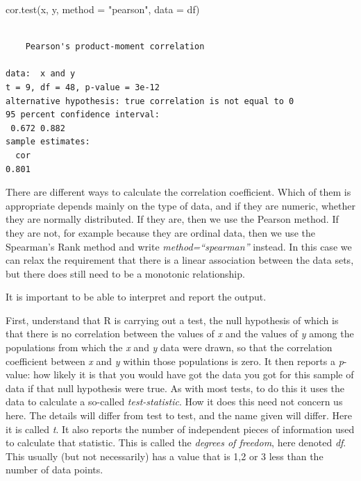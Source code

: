 \documentclass[
  letterpaper,
  DIV=11,
  numbers=noendperiod]{scrreprt}
\newenvironment{Shaded}{\begin{snugshade}}{\end{snugshade}}
\newcommand{\AttributeTok}[1]{\textcolor[rgb]{0.40,0.45,0.13}{#1}}
\newcommand{\FunctionTok}[1]{\textcolor[rgb]{0.28,0.35,0.67}{#1}}
\newcommand{\NormalTok}[1]{\textcolor[rgb]{0.00,0.23,0.31}{#1}}
\newcommand{\StringTok}[1]{\textcolor[rgb]{0.13,0.47,0.30}{#1}}
\begin{document}
\begin{Shaded}
\begin{Highlighting}[]
\FunctionTok{cor.test}\NormalTok{(x, y, }\AttributeTok{method =} \StringTok{"pearson"}\NormalTok{, }\AttributeTok{data =}\NormalTok{ df)}
\end{Highlighting}
\end{Shaded}

\begin{verbatim}

    Pearson's product-moment correlation

data:  x and y
t = 9, df = 48, p-value = 3e-12
alternative hypothesis: true correlation is not equal to 0
95 percent confidence interval:
 0.672 0.882
sample estimates:
  cor 
0.801 
\end{verbatim}

There are different ways to calculate the correlation coefficient. Which
of them is appropriate depends mainly on the type of data, and if they
are numeric, whether they are normally distributed. If they are, then we
use the Pearson method. If they are not, for example because they are
ordinal data, then we use the Spearman's Rank method and write
\emph{method=``spearman''} instead. In this case we can relax the
requirement that there is a linear association between the data sets,
but there does still need to be a monotonic relationship.

It is important to be able to interpret and report the output.

First, understand that R is carrying out a test, the null hypothesis of
which is that there is no correlation between the values of \emph{x} and
the values of \emph{y} among the populations from which the \emph{x} and
\emph{y} data were drawn, so that the correlation coefficient between
\emph{x} and \emph{y} within those populations is zero. It then reports
a \emph{p}-value: how likely it is that you would have got the data you
got for this sample of data if that null hypothesis were true. As with
most tests, to do this it uses the data to calculate a so-called
\emph{test-statistic}. How it does this need not concern us here. The
details will differ from test to test, and the name given will differ.
Here it is called \emph{t}. It also reports the number of independent
pieces of information used to calculate that statistic. This is called
the \emph{degrees of freedom}, here denoted \emph{df}. This usually (but
not necessarily) has a value that is 1,2 or 3 less than the number of
data points.
\end{document}

